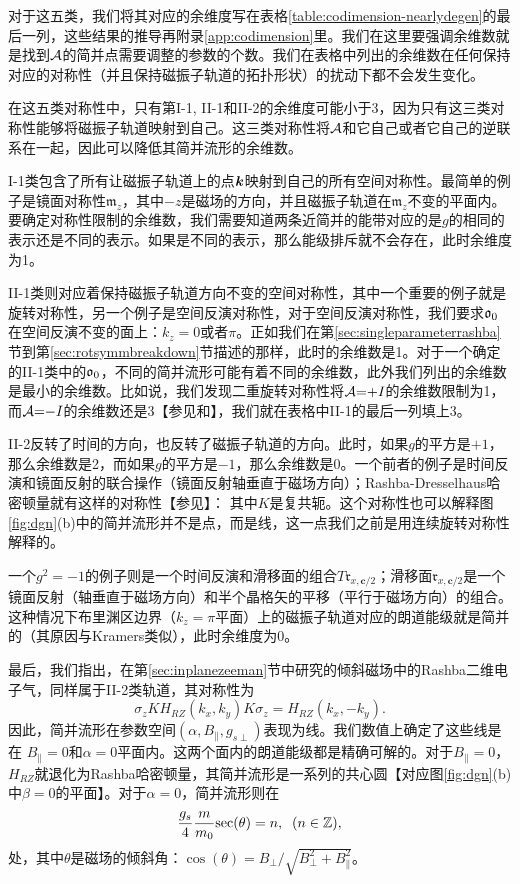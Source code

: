 对于这五类，我们将其对应的余维度写在表格\ref{table:codimension-nearlydegen}的最后一列，这些结果的推导再附录\ref{app:codimension}里。我们在这里要强调余维数就是找到${\cal A}$的简并点需要调整的参数的个数。我们在表格中列出的余维数在任何保持对应的对称性（并且保持磁振子轨道的拓扑形状）的扰动下都不会发生变化。
 
在这五类对称性中，只有第I-1, II-1和II-2的余维度可能小于3，因为只有这三类对称性能够将磁振子轨道映射到自己。这三类对称性将${\cal A}$和它自己或者它自己的逆联系在一起，因此可以降低其简并流形的余维数。

I-1类包含了所有让磁振子轨道上的点$\boldsymbol{k}$映射到自己的所有空间对称性。最简单的例子是镜面对称性$\mathfrak{m}_z$，其中$-z$是磁场的方向，并且磁振子轨道在$\mathfrak{m}_z$不变的平面内。要确定对称性限制的余维数，我们需要知道两条近简并的能带对应的是$g$的相同的表示还是不同的表示。如果是不同的表示，那么能级排斥就不会存在，此时余维度为1。

II-1类则对应着保持磁振子轨道方向不变的空间对称性，其中一个重要的例子就是旋转对称性，另一个例子是空间反演对称性，对于空间反演对称性，我们要求$\mathfrak{o}_0$在空间反演不变的面上：$k_z=0$或者$\pi$。正如我们在第\ref{sec:singleparameterrashba}节到第\ref{sec:rotsymmbreakdown}节描述的那样，此时的余维数是1。对于一个确定的II-1类中的$\mathfrak{o}_0$，不同的简并流形可能有着不同的余维数，此外我们列出的余维数是最小的余维数。比如说，我们发现二重旋转对称性将${\cal A}{=}{+}I$的余维数限制为1，而${\cal A}{=}{-}I$的余维数还是3【参见和】，我们就在表格中II-1的最后一列填上3。


II-2反转了时间的方向，也反转了磁振子轨道的方向。此时，如果$g$的平方是$+1$，那么余维数是2，而如果$g$的平方是$-1$，那么余维数是0。一个前者的例子是时间反演和镜面反射的联合操作（镜面反射轴垂直于磁场方向）；Rashba-Dresselhaus哈密顿量就有这样的对称性【参见】：
其中$K$是复共轭。这个对称性也可以解释图\ref{fig:dgn}(b)中的简并流形并不是点，而是线，这一点我们之前是用连续旋转对称性解释的。


一个$g^2{=}-1$的例子则是一个时间反演和滑移面的组合$T\mathfrak{r}_{x,\boldsymbol{c}/2}$；滑移面$\mathfrak{r}_{x,\boldsymbol{c}/2}$是一个镜面反射（轴垂直于磁场方向）和半个晶格矢的平移（平行于磁场方向）的组合。这种情况下布里渊区边界（$k_z{=}\pi$平面）上的磁振子轨道对应的朗道能级就是简并的（其原因与Kramers类似），此时余维度为0。

最后，我们指出，在第\ref{sec:inplanezeeman}节中研究的倾斜磁场中的Rashba二维电子气，同样属于II-2类轨道，其对称性为
\begin{equation}
\sigma_z K H_{RZ}(k_x, k_y) K \sigma_z=H_{RZ}(k_x, -k_y).
\end{equation}
因此，简并流形在参数空间$(\alpha, B_\parallel, g_{s\perp})$表现为线。我们数值上确定了这些线是在 $B_\parallel=0$和$\alpha=0$平面内。这两个面内的朗道能级都是精确可解的。对于$B_\parallel=0$，$H_{RZ}$就退化为Rashba哈密顿量，其简并流形是一系列的共心圆【对应图\ref{fig:dgn}(b)中$\beta=0$的平面】。对于$\alpha=0$，简并流形则在
\begin{equation}
    \frac{g_s}{4} \frac{ m}{ m_0}\text{sec}(\theta)=n,\;\;(n\in\mathbb{Z}),
\end{equation}
处，其中$\theta$是磁场的倾斜角：$\cos(\theta)=B_\perp/\sqrt{B_\perp^2+B_\parallel^2}$。


